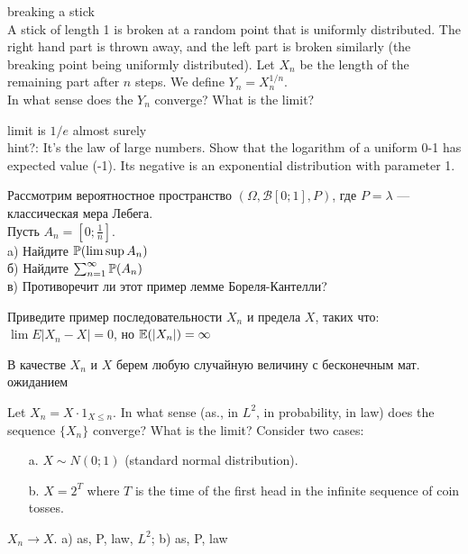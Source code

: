 \begin{problem}
 breaking a stick \\
A stick of length 1 is broken at a random point that is uniformly distributed. The right hand part is thrown away, and the left part is broken similarly (the breaking point being uniformly distributed). Let $X_{n}$ be the length of the remaining part after $n$ steps. We define $Y_{n}=X_{n}^{1/n}$. \\
In what sense does the $Y_{n}$ converge? What is the limit?

\begin{sol}

limit is $1/e$ almost surely \\
hint?: It's the law of large numbers. Show that the logarithm of a uniform 0-1 has expected value (-1). Its negative is an exponential distribution with parameter 1.
\end{sol}
\end{problem}

\begin{problem}
Рассмотрим вероятностное пространство
$(\Omega,\mathcal{B}[0;1],P)$, где $P=\lambda$ — классическая
мера Лебега.\\
Пусть $A_{n}=[0;\frac{1}{n}]$. \\
a) Найдите $\P(\limsup A_{n})$ \\
б) Найдите $\sum_{n=1}^{\infty}\P(A_{n})$ \\
в) Противоречит ли этот пример лемме Бореля-Кантелли?

\begin{sol}

\end{sol}
\end{problem}

\begin{problem}
Приведите пример последовательности $X_{n}$ и предела $X$, таких что: $\lim E|X_{n}-X|=0$, но $\E(|X_{n}|)=\infty$

\begin{sol}
 В качестве $X_{n}$ и $ X $ берем любую случайную величину с бесконечным мат. ожиданием
\end{sol}
\end{problem}

\begin{problem}
Let $X_{n}=X\cdot 1_{X\leq n}$. In what sense (as., in $L^{2}$, in probability, in law) does the sequence $ \{X_{n}\} $ converge? What is the limit? Consider two cases:
\begin{itemize}
\item[a.] $ X\sim N(0;1) $ (standard normal distribution).
\item[b.] $ X =2^{T}$ where $T$ is the time of the first head in the infinite sequence of coin tosses.
\end{itemize}


\begin{sol}
 $ X_{n}\to X $. a) as, P, law, $ L^{2} $; b) as, P, law
\end{sol}
\end{problem}

